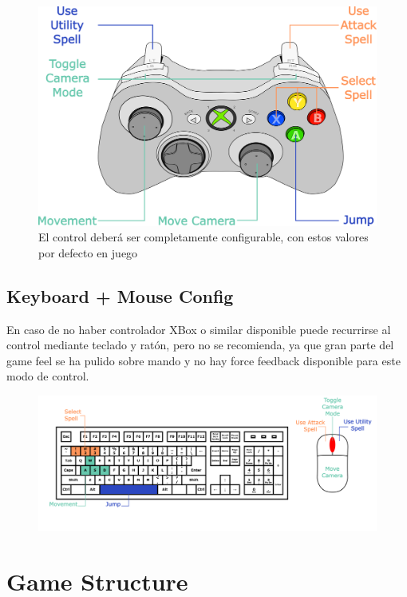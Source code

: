 \documentclass[12pt]{report}
\begin{document}
\begin{figure}[h]
    \centering
    \includegraphics[width=\textwidth]{controller}
    \caption{El control deberá ser completamente configurable, con estos valores por defecto en juego}
\end{figure}

\subsection{Keyboard + Mouse Config}

En caso de no haber controlador XBox o similar disponible puede recurrirse al control mediante teclado y ratón, pero no se recomienda, ya que gran parte del game feel se ha pulido sobre mando y no hay force feedback disponible para este modo de control.

\begin{figure}[h]
    \centering
    \includegraphics[width=\textwidth]{keyboard}
\end{figure}     

\section{Game Structure}              
\end{document}
